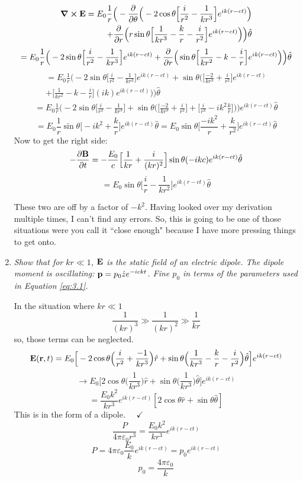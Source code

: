 \documentclass[12pt]{article}
\begin{document}
\begin{enumerate}[label=\alph*)]
\begin{align*}
\curl{\vb{E}} = E_0 \frac{1}{r} \Big(-\pdv{\theta}\Big(-2\cos\theta \Big[\frac{i}{r^2} - \frac{1}{kr^3}\Big]e^{ik(r-ct)}\Big) \\ + \pdv{r}\Big(r\sin\theta \Big[\frac{1}{kr^3} - \frac{k}{r} - \frac{i}{r^2}\Big]e^{ik(r-ct)}\Big)\Big)\hat{\theta}
\end{align*}
\begin{align*}
=E_0\frac{1}{r}\Big(-2\sin\theta \Big[\frac{i}{r^2} - \frac{1}{kr^3}\Big]e^{ik(r-ct)} + \pdv{r}\Big(\sin\theta \Big[\frac{1}{kr^2} - k -\frac{i}{r}\Big]e^{ik(r-ct)}\Big)\Big)\hat{\theta}
\end{align*}
\begin{align*}
= E_0 \frac{1}{r}\Big(-2\sin\theta \Big[\frac{i}{r^2} - \frac{1}{kr^3}\Big]e^{ik(r-ct)} + \sin\theta \Big(\Big[\frac{-2}{kr^3} + \frac{i}{r^2}\Big]e^{ik(r-ct)} \\ + \Big[\frac{1}{kr^2} - k -\frac{i}{r}\Big](ik)e^{ik(r-ct)}\Big)\Big)\hat{\theta}
\end{align*}
\begin{align*}
= E_0 \frac{1}{r} \Big(-2\sin\theta \Big[\frac{i}{r^2} - \frac{1}{kr^3}\Big] + \sin\theta \Big(\Big[\frac{-2}{kr^3} + \frac{i}{r^2}\Big] + \Big[\frac{i}{r^2} -ik^2 \frac{k}{r}\Big]\Big)\Big)e^{ik(r-ct)}\hat{\theta}
\end{align*}
\[= E_0 \frac{1}{r} \sin\theta \Big[-ik^2 + \frac{k}{r}\Big]e^{ik(r - ct)}\hat{\theta} = E_0 \sin\theta \Big[\frac{-ik^2}{r} + \frac{k}{r^2}\Big]e^{ik(r - ct)}\hat{\theta}\]
Now to get the right side:
\[-\pdv{\vb{B}}{t} = -\frac{E_0}{c} \Big[\frac{1}{kr} + \frac{i}{(kr)^2}\Big]\sin\theta (-ikc) e^{ik(r-ct)}\hat{\theta}\]
\[ = E_0 \sin\theta \Big[\frac{i}{r} - \frac{1}{k r^2}\Big]e^{ik(r - ct)}\hat{\theta}\]

These two are off by a factor of $-k^2$. Having looked over my derivation multiple times, I can't find any errors. So, this is going to be one of those situations were you call it ``close enough" because I have more pressing things to get onto.

\item {\sl Show that for $kr \ll 1$, $\vb{E}$ is the static field of an electric dipole. The dipole moment is oscillating: $\vb{p} = p_0\hat{z}e^{-ickt}$. Fine $p_0$ in terms of the parameters used in Equation \ref{eq:3.1}.}

In the situation where $kr \ll 1$
\[\frac{1}{(kr)^3} \gg \frac{1}{(kr)^2} \gg \frac{1}{kr}\]
so, those terms can be neglected.
\[\vb{E}(\vb{r}, t) = E_0\Big[-2\cos\theta \Big(\frac{i}{r^2} + \frac{-1}{kr^3}\Big)\hat{r} + \sin\theta \Big(\frac{1}{kr^3} - \frac{k}{r} - \frac{i}{r^2}\Big)\hat{\theta}\Big]e^{ik(r-ct)}\]
\[\rightarrow E_0\Big[2\cos\theta \Big(\frac{1}{kr^3}\Big)\hat{r} + \sin\theta \Big(\frac{1}{kr^3}\Big)\hat{\theta}\Big]e^{ik(r-ct)}\]
\[ = \frac{E_0 k^2}{kr^3}e^{ik(r-ct)} [2 \cos\theta \hat{r} +\sin\theta \hat{\theta}]\]
This is in the form of a dipole. $ \quad \checkmark$
\[\frac{P}{4\pi \varepsilon_0 r^3} = \frac{E_0 k^2}{kr^3}e^{ik(r-ct)} \]
\[P = 4 \pi \varepsilon_0 \frac{E_0}{k}e^{ik(r-ct)} = p_0 e^{ik(r-ct)}\]
\[\boxed{p_0 = \frac{4 \pi \varepsilon_0}{k}}\]


\end{enumerate}
\end{document}
